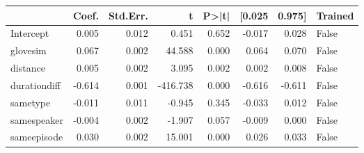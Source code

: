 \begin{tabular}{lrrrrrrl}
\toprule
{} &  Coef. &  Std.Err. &        t &  P>|t| &  [0.025 &  0.975] &  Trained \\
\midrule
Intercept    &  0.005 &     0.012 &    0.451 &  0.652 &  -0.017 &   0.028 &    False \\
glovesim     &  0.067 &     0.002 &   44.588 &  0.000 &   0.064 &   0.070 &    False \\
distance     &  0.005 &     0.002 &    3.095 &  0.002 &   0.002 &   0.008 &    False \\
durationdiff & -0.614 &     0.001 & -416.738 &  0.000 &  -0.616 &  -0.611 &    False \\
sametype     & -0.011 &     0.011 &   -0.945 &  0.345 &  -0.033 &   0.012 &    False \\
samespeaker  & -0.004 &     0.002 &   -1.907 &  0.057 &  -0.009 &   0.000 &    False \\
sameepisode  &  0.030 &     0.002 &   15.001 &  0.000 &   0.026 &   0.033 &    False \\
\bottomrule
\end{tabular}


